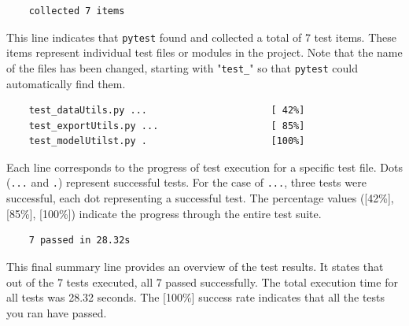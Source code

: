 \begin{verbatim}
	collected 7 items
\end{verbatim}

This line indicates that \texttt{pytest} found and collected a total of 7 test items. These items represent individual test files or modules in the project. Note that the name of the files has been changed, starting with "\texttt{test\_}" so that \texttt{pytest} could automatically find them.

\begin{verbatim}
	test_dataUtils.py ...                      [ 42%]
	test_exportUtils.py ...                    [ 85%]
	test_modelUtilst.py .                      [100%]
\end{verbatim}

Each line corresponds to the progress of test execution for a specific test file. Dots (\texttt{...} and \texttt{.}) represent successful tests. For the case of \texttt{...}, three tests were successful, each dot representing a successful test. The percentage values ([42\%], [85\%], [100\%]) indicate the progress through the entire test suite.

\begin{verbatim}
	7 passed in 28.32s 
\end{verbatim}

This final summary line provides an overview of the test results. It states that out of the 7 tests executed, all 7 passed successfully. The total execution time for all tests was 28.32 seconds. The [100\%] success rate indicates that all the tests you ran have passed.


